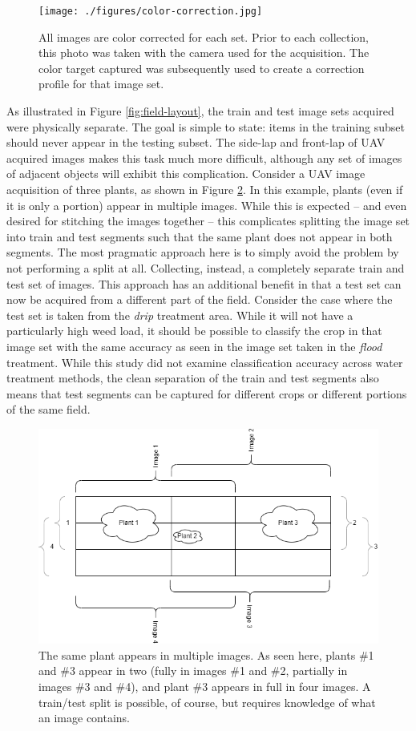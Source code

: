 \documentclass[letterpaper]{article}
\begin{document}
{\begin{figure}[h!]
	\centering
	\texttt{[image: ./figures/color-correction.jpg]}
	\caption[Color correction target and image set identification]{All images are color corrected for each set. Prior to each collection, this photo was taken with the camera used for the acquisition. The color target captured was subsequently used to create a correction profile for that image set.}
	\label{fig:color-correction}
\end{figure}

As illustrated in Figure \ref{fig:field-layout}, the train and test image sets acquired were physically separate. The goal is simple to state: items in the training subset should never appear in the testing subset. The side-lap and front-lap of UAV acquired images makes this task much more difficult, although any set of images of adjacent objects will exhibit this complication. Consider a UAV image acquisition of three plants, as shown in Figure \ref{fig:uav-overlap}. In this example, plants (even if it is only a portion) appear in multiple images. While this is expected -- and even desired for stitching the images together -- this complicates splitting the image set into train and test segments such that the same plant does not appear in both segments. The most pragmatic approach here is to simply avoid the problem by not performing a split at all. Collecting, instead, a completely separate train and test set of images. This approach has an additional benefit in that a test set can now be acquired from a different part of the field. Consider the case where the test set is taken from the \textit{drip} treatment area. While it will not have a particularly high weed load, it should be possible to classify the crop in that image set with the same accuracy as seen in the image set taken in the \textit{flood} treatment. While this study did not examine classification accuracy across water treatment methods, the clean separation of the train and test segments also means that test segments can be captured for different crops or different portions of the same field.

\begin{figure}[h!]
	\centering
	\includegraphics[width=0.5\linewidth]{./figures/overlap.png}
	\caption[Image overlap in UAV images]{The same plant appears in multiple images. As seen here, plants \#1 and \#3 appear in two (fully in images \#1 and \#2, partially in images \#3 and \#4), and plant \#3 appears in full in four images. A train/test split is possible, of course, but requires knowledge of what an image contains.}
	\label{fig:uav-overlap}
\end{figure}

}
\end{document}

